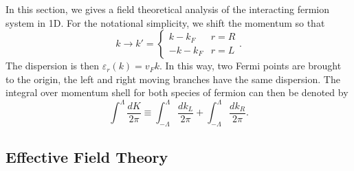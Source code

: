 In this section, we gives a field theoretical analysis of the interacting fermion system in 1D.
For the notational simplicity, we shift the momentum so that
\begin{equation}
	k \rightarrow k' = \begin{cases}
		k - k_F & r=R \\
		-k - k_F & r=L
	\end{cases}.
\end{equation}
The dispersion is then $\varepsilon_r(k) = v_F k$.
In this way, two Fermi points are brought to the origin, the left and right moving branches have the same dispersion.
The integral over momentum shell for both species of fermion can then be denoted by
\begin{equation}
	\int^\Lambda \frac{dK}{2\pi} \equiv \int_{-\Lambda}^\Lambda \frac{dk_L}{2\pi} + \int_{-\Lambda}^\Lambda \frac{dk_R}{2\pi}.
\end{equation}



\subsection{Effective Field Theory}

